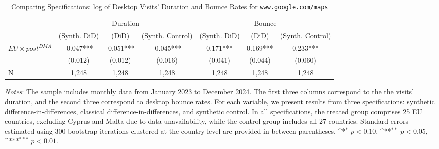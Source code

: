 \documentclass[11pt]{article}
\begin{document}
	
	\begin{table}[ht!]
		\centering
		\def\sym#1{\ifmmode^{#1}\else\(^{#1}\)\fi}
		\caption{\label{tab:sdid_duration_bounce} Comparing Specifications: log of Desktop Visits' Duration and Bounce Rates for \texttt{www.google.com/maps}}
		\begin{threeparttable}
			\begin{adjustbox}{max width=\linewidth}
				\begin{tabular}{lcccccc}
					\hline \noalign{\smallskip} 
					& \multicolumn{3}{c}{Duration} & \multicolumn{3}{c}{Bounce}  \\ \cmidrule(lr){2-4}\cmidrule(lr){5-7}
					
					&(Synth. DiD)   &       (DiD)   &(Synth. Control)   &(Synth. DiD)   &       (DiD)   &(Synth. Control)   \\
					\midrule
					$ EU \times post^{DMA} $ &      -0.047***&      -0.051***&      -0.045***&       0.171***&       0.169***&       0.233***\\
					&     (0.012)   &     (0.012)   &     (0.016)   &     (0.041)   &     (0.044)   &     (0.060)   \\
					
					N                   &       1,248   &       1,248   &       1,248   &       1,248   &       1,248   &       1,248   \\
					\midrule
				\end{tabular}
			\end{adjustbox}
			\begin{tablenotes}
				\item \footnotesize \emph{Notes}: The sample includes monthly data from January 2023 to December 2024.  The first three columns correspond to the the visits' duration, and the second three correspond to desktop bounce rates. For each variable, we present results from three specifications: synthetic difference-in-differences, classical difference-in-differences, and synthetic control. In all specifications, the treated group comprises 25 EU countries, excluding Cyprus and Malta due to data unavailability, while the control group includes all 27 countries. Standard errors estimated using 300 bootstrap iterations clustered at the country level are provided in between parentheses. \sym{*} \(p<0.10\), \sym{**} \(p<0.05\), \sym{***}  \(p<0.01\). 
			\end{tablenotes}
		\end{threeparttable}
	\end{table}
	
\end{document}

